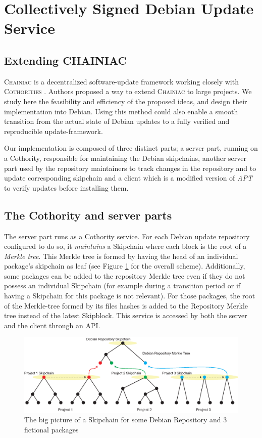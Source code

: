 \documentclass[11pt, upma4paper, twoside, openany, parskip=half]{book}
\begin{document}
	
\section{Collectively Signed Debian Update Service}

\subsection{Extending CHAINIAC}
\textsc{Chainiac} \cite{_back_2016} is a decentralized software-update framework working closely with \textsc{Cothorities} \cite{syta_keeping_2015}. Authors proposed a way to extend \textsc{Chainiac} to large projects. We study here the feasibility and efficiency of the proposed ideas, and design their implementation into Debian. Using this method could also enable a smooth transition from the actual state of Debian updates to a fully verified and reproducible update-framework.

Our implementation is composed of three distinct parts; a server part, running on a Cothority, responsible for maintaining the Debian skipchains, another server part used by the repository maintainers to track changes in the repository and to update corresponding skipchain and a client which is a modified version of \emph{APT} to verify updates before installing them.

\subsection{The Cothority and server parts}
The server part runs as a Cothority service. For each Debian update repository configured to do so, it \emph{maintains} a Skipchain where each block is the root of a \emph{Merkle tree}. This Merkle tree is formed by having the head of an individual package's skipchain as leaf (see Figure \ref{overall_skipchain} for the overall scheme). Additionally, some packages can be added to the repository Merkle tree even if they do not possess an individual Skipchain (for example during a transition period or if having a Skipchain for this package is not relevant). For those packages, the root of the Merkle-tree formed by its files hashes is added to the Repository Merkle tree instead of the latest Skipblock. This service is accessed by both the server and the client through an API. 

\begin{figure}[H]
	\centering
	\includegraphics[width=380pt]{overall_skipchains}\vspace{-0pt}
	\caption{The big picture of a Skipchain for some Debian Repository and 3 fictional packages}
	\label{overall_skipchain}
\end{figure}
\end{document}
